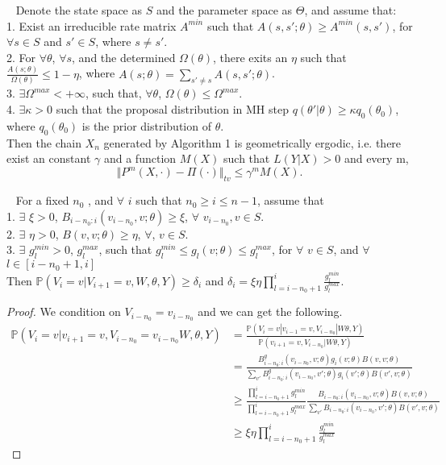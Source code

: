 \begin{theorem}~
  Denote the state space as $S$ and the parameter space as $\Theta$, and assume that:\\
1. Exist an irreducible rate matrix $A^{min}$ such that $A(s, s';\theta) \geq A^{min}(s, s')$, for $\forall s \in S$ and $s' \in S$, where $s \neq s'$.\\
2. For $\forall \theta$, $\forall s$,  and the determined $\Omega(\theta)$, there exits an $\eta$ such that $\frac{A(s; \theta)}{\Omega(\theta)} \leq 1 - \eta$, where $A(s; \theta) = \sum_{s' \neq s} A(s, s';\theta)$.\\
3. $\exists \Omega^{max} < +\infty$, such that, $\forall \theta$, $\Omega(\theta) \leq \Omega^{max}$.\\
4. $\exists \kappa > 0$ such that the proposal distribution in MH step $q(\theta' | \theta) \geq \kappa q_0(\theta_0)$, where $q_0(\theta_0)$ is the prior distribution of $\theta$.\\
\indent Then the chain $X_n$ generated by Algorithm 1 is geometrically ergodic, i.e. there exist an constant $\gamma$ and a function $M(X)$ such that $L(Y | X) > 0$ and every m, $$\Vert P^m(X, \cdot) - \Pi(\cdot) \Vert_{tv} \leq \gamma^m M(X).$$
\end{theorem} 
\begin{lemma}~
   For a fixed $n_0$ , and $\forall$ $i$  such that $ n_0 \geq i \leq n - 1$, assume that\\
1. $\exists$  $ \xi > 0$, $B_{i - n_0: i}(v_{i - n_0}, v; \theta) \geq \xi$, $\forall$ $v_{i - n_0}, v \in S$.\\
2. $\exists$  $\eta > 0$, $B(v,v ; \theta) \geq \eta$, $\forall$, $v \in S$.\\
3. $\exists$  $g_l^{min} > 0$, $g_l^{max}$, such that $g_l^{min} \leq g_l(v; \theta) \leq g_l^{max}$, for $\forall$ $v \in S$, and $\forall$ $l \in [i - n_0 + 1, i]$\\ 
Then $\mathbb{P}(V_i = v | V_{i + 1} = v, W, \theta, Y) \geq \delta_i$ and $\delta_i = \xi\eta \prod_{l = i - n_0 + 1}^i \frac{g_l^{min}}{g_l^{max}}$.
\end{lemma}
\begin{proof}
  We condition on $V_{i - n_0} = v_{i - n_0}$ and we can get the following. 
\begin{align*}
\mathbb{P}(V_i = v | v_{i + 1} = v, V_{i - n_0} = v_{i - n_0} W, \theta, Y) &= \frac{\mathbb{P}(V_i = v | v_{i - 1} = v, V_{i - n_0}| W \theta, Y)}{\mathbb{P}(v_{i + 1} = v, V_{i - n_0}| W \theta, Y)} \\
&= \frac{B_{i - n_0: i}^g(v_{i - n_0}, v; \theta)g_i(v;\theta)B(v,v;\theta)}{\sum_{v'}B_{i - n_0: i}^g(v_{i - n_0}, v'; \theta)g_i(v';\theta)B(v',v;\theta)} \\
&\geq \frac{\prod_{l = i - n_0 + 1}^i g_l^{min}}{\prod_{l = i - n_0 + 1}^i g_l^{max}} \frac{B_{i - n_0: i}(v_{i - n_0}, v; \theta)B(v, v; \theta)}{\sum_{v'}B_{i - n_0: i}(v_{i - n_0}, v'; \theta)B(v', v; \theta)}\\
&\geq \xi \eta \prod_{l = i - n_0 + 1}^i \frac{g_l^{min}}{g_l^{max}}
\end{align*}
\end{proof}

